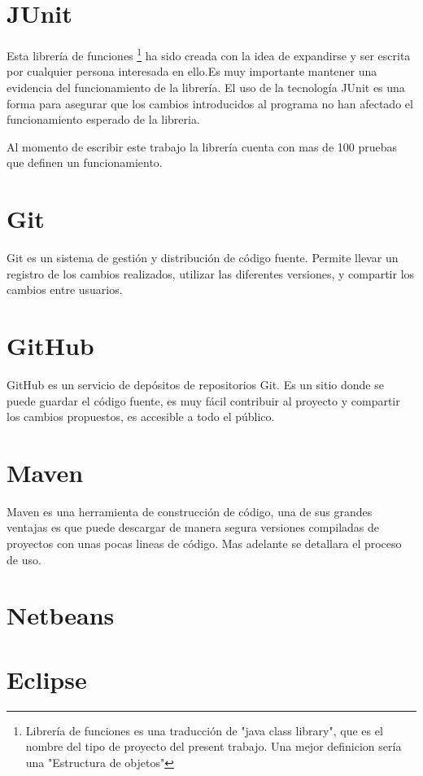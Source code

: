 	\section{JUnit}

		Esta librería de funciones \footnote{Librería de funciones es una traducción de "java class library", que es el nombre del tipo de proyecto del present trabajo. Una mejor definicion sería una "Estructura de objetos"} ha sido creada con la idea de expandirse y ser escrita por cualquier persona interesada en ello.Es muy importante mantener una evidencia del funcionamiento de la librería. El uso de la tecnología JUnit es una forma para asegurar que los cambios introducidos al programa no han afectado el funcionamiento esperado de la libreria.

		Al momento de escribir este trabajo la librería cuenta con mas de 100 pruebas que definen un funcionamiento.
	\section{Git}

		Git es un sistema de gestión y distribución de código fuente. Permite llevar un registro de los cambios realizados, utilizar las diferentes versiones, y compartir los cambios entre usuarios.

	\section{GitHub}

		GitHub es un servicio de depósitos de repositorios Git. Es un sitio donde se puede guardar el código fuente, es muy fácil contribuir al proyecto y compartir los cambios propuestos, es accesible a todo el público.

	\section{Maven}

		Maven es una herramienta de construcción de código, una de sus grandes ventajas es que puede descargar de manera segura versiones compiladas de proyectos con unas pocas lineas de código. Mas adelante se detallara el proceso de uso.

	\section{Netbeans}
	\section{Eclipse}

